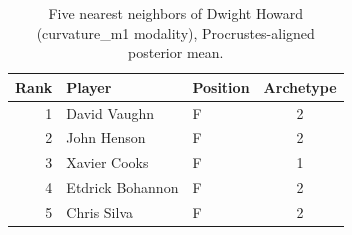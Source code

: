 \begin{table}[htbp]
  \centering\small
  \begin{tabular}{rllc}
    \toprule
    Rank & Player & Position & Archetype \\
    \midrule
    1 & David Vaughn & F & 2 \\
    2 & John Henson & F & 2 \\
    3 & Xavier Cooks & F & 1 \\
    4 & Etdrick Bohannon & F & 2 \\
    5 & Chris Silva & F & 2 \\
    \bottomrule
  \end{tabular}
  \caption{Five nearest neighbors of Dwight Howard (curvature_m1 modality), Procrustes-aligned posterior mean.}
  \label{tab:Dwight_Howard_neighbors_curvature_m1}
\end{table}

